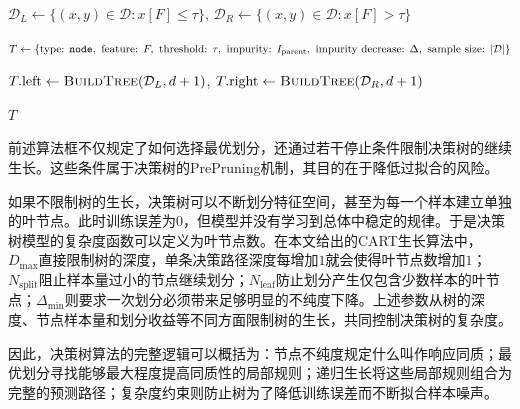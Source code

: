 \begin{algorithm}[H]
\begin{algorithmic}[1]
		\If{$\Delta<\Delta_{\min}$}
		\State \Return {}
		\EndIf
		
		\State $\mathcal{D}_L\gets
		\{(x,y)\in\mathcal{D}:x[F]\leqslant\tau\}$, 
		$\mathcal{D}_R\gets
		\{(x,y)\in\mathcal{D}:x[F]>\tau\}$
		
		\State $T\gets
		\{\text{type: \texttt{node}},
		\text{ feature: }F,
		\text{ threshold: }\tau,
		\text{ impurity: }I_{\mathrm{parent}},
		\text{ impurity decrease: }\Delta,
		\text{ sample size: }|\mathcal{D}|\}$
		
		\State $T.\text{left}\gets
		\Call{BuildTree}{\mathcal{D}_L,d+1}$, 
		$T.\text{right}\gets
		\Call{BuildTree}{\mathcal{D}_R,d+1}$
		
		\State \Return $T$
		\EndFunction
		
		\State \Return {}
	\end{algorithmic}
\end{algorithm}
前述算法框不仅规定了如何选择最优划分，还通过若干停止条件限制决策树的继续生长。这些条件属于决策树的\gls{PrePruning}机制，其目的在于降低过拟合的风险。\par
如果不限制树的生长，决策树可以不断划分特征空间，甚至为每一个样本建立单独的叶节点。此时训练误差为$0$，但模型并没有学习到总体中稳定的规律。于是决策树模型的复杂度函数可以定义为叶节点数。在本文给出的CART生长算法中，$D_{\max}$直接限制树的深度，单条决策路径深度每增加$1$就会使得叶节点数增加$1$；$N_{\mathrm{split}}$阻止样本量过小的节点继续划分；$N_{\mathrm{leaf}}$防止划分产生仅包含少数样本的叶节点；$\Delta_{\min}$则要求一次划分必须带来足够明显的不纯度下降。上述参数从树的深度、节点样本量和划分收益等不同方面限制树的生长，共同控制决策树的复杂度。\par
因此，决策树算法的完整逻辑可以概括为：节点不纯度规定什么叫作响应同质；最优划分寻找能够最大程度提高同质性的局部规则；递归生长将这些局部规则组合为完整的预测路径；复杂度约束则防止树为了降低训练误差而不断拟合样本噪声。
